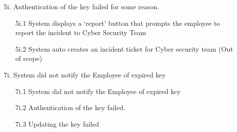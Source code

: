 \documentclass[]{article}
\begin{document}
\begin{enumerate}[{\bf BE1.}]
\begin{enumerate}[{\bf BE9.}]
\begin{enumerate}
                    \item[5i.] Authentication of the key failed for some reason.
                    \begin{enumerate}
                        \item[5i.1] System displays a ‘report’ button that prompts the employee to report the incident to Cyber Security Team
                        \item[5i.2] System auto creates an incident ticket for Cyber security team (Out of scope) 
                    \end{enumerate}
		    \item[7i.]  System did not notify the Employee of expired key
                    \begin{enumerate}
                        \item[7i.1] System did not notify the Employee of expired key
                        \item[7i.2] Authentication of the key failed.
			\item[7i.3] Updating the key failed
                    \end{enumerate}
                \end{enumerate}
\end{enumerate}

\end{enumerate}
\end{document}
